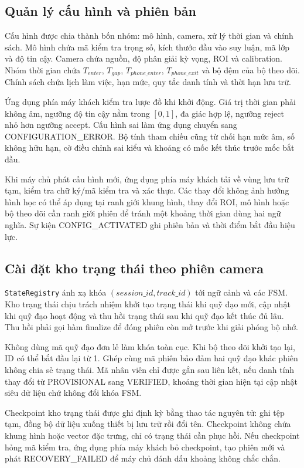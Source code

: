 \subsection{Quản lý cấu hình và phiên bản}
Cấu hình được chia thành bốn nhóm: mô hình, camera, xử lý thời gian và chính sách. Mô hình chứa mã kiểm tra trọng số, kích thước đầu vào suy luận, mã lớp và độ tin cậy. Camera chứa nguồn, độ phân giải kỳ vọng, ROI và calibration. Nhóm thời gian chứa $T_{enter}$, $T_{gap}$, $T_{phone\_enter}$, $T_{phone\_exit}$ và bộ đệm của bộ theo dõi. Chính sách chứa lịch làm việc, hạn mức, quy tắc danh tính và thời hạn lưu trữ.

Ứng dụng phía máy khách kiểm tra lược đồ khi khởi động. Giá trị thời gian phải không âm, ngưỡng độ tin cậy nằm trong $[0,1]$, đa giác hợp lệ, ngưỡng reject nhỏ hơn ngưỡng accept. Cấu hình sai làm ứng dụng chuyển sang CONFIGURATION\_ERROR. Bộ tính tham chiếu cũng từ chối hạn mức âm, số không hữu hạn, cờ điều chỉnh sai kiểu và khoảng có mốc kết thúc trước mốc bắt đầu.

Khi máy chủ phát cấu hình mới, ứng dụng phía máy khách tải về vùng lưu trữ tạm, kiểm tra chữ ký/mã kiểm tra và xác thực. Các thay đổi không ảnh hưởng hình học có thể áp dụng tại ranh giới khung hình, thay đổi ROI, mô hình hoặc bộ theo dõi cần ranh giới phiên để tránh một khoảng thời gian dùng hai ngữ nghĩa. Sự kiện CONFIG\_ACTIVATED ghi phiên bản và thời điểm bắt đầu hiệu lực.

\subsection{Cài đặt kho trạng thái theo phiên camera}
\texttt{StateRegistry} ánh xạ khóa $(session\_id, track\_id)$ tới ngữ cảnh và các FSM. Kho trạng thái chịu trách nhiệm khởi tạo trạng thái khi quỹ đạo mới, cập nhật khi quỹ đạo hoạt động và thu hồi trạng thái sau khi quỹ đạo kết thúc đủ lâu. Thu hồi phải gọi hàm finalize để đóng phiên còn mở trước khi giải phóng bộ nhớ.

Không dùng mã quỹ đạo đơn lẻ làm khóa toàn cục. Khi bộ theo dõi khởi tạo lại, ID có thể bắt đầu lại từ 1. Ghép cùng mã phiên bảo đảm hai quỹ đạo khác phiên không chia sẻ trạng thái. Mã nhân viên chỉ được gắn sau liên kết, nếu danh tính thay đổi từ PROVISIONAL sang VERIFIED, khoảng thời gian hiện tại cập nhật siêu dữ liệu chứ không đổi khóa FSM.

Checkpoint kho trạng thái được ghi định kỳ bằng thao tác nguyên tử: ghi tệp tạm, đồng bộ dữ liệu xuống thiết bị lưu trữ rồi đổi tên. Checkpoint không chứa khung hình hoặc vector đặc trưng, chỉ có trạng thái cần phục hồi. Nếu checkpoint hỏng mã kiểm tra, ứng dụng phía máy khách bỏ checkpoint, tạo phiên mới và phát RECOVERY\_FAILED để máy chủ đánh dấu khoảng không chắc chắn.

